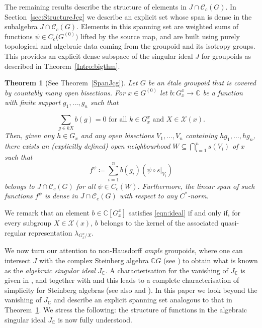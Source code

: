 \documentclass[11pt, oneside, reqno]{amsart}
\newcommand{\Gu}{G^{(0)}}
\newcommand{\cg}{\mathscr{C}_c(G)}
\newcommand{\PRLsep}{\noindent\makebox[\linewidth]{\resizebox{0.3333\linewidth}{1pt}{$\bullet$}}\bigskip}
\newtheorem{introthm}{Theorem}
\theoremstyle{definition}
\theoremstyle{remark}
\numberwithin{equation}{section}
\begin{document}
\PRLsep

\vspace{-0.1cm}
The remaining results  describe the structure of elements in $J \cap \cg$. In Section~\ref{sec:StructureJcg} we describe an explicit set whose span is dense in the subalgebra $J \cap \cg$. Elements in this spanning set are weighted sums of functions $\psi \in C_c\big(\Gu\big)$ lifted by the source map, and are built using purely topological and algebraic data coming from the groupoid and its isotropy groups. This provides an explicit dense subspace of the singular ideal $J$ for groupoids as described in Theorem~\ref{Intro:bigthm}. 

\begin{introthm}[See Theorem~\ref{SpanJcg}]\label{Intro:SpanJcg}
Let $G$ be an \'etale groupoid that is covered by countably many open bisections. For $x\in \Gu$ let $b \colon G^{x}_{x}\to\mathbb{C}$ be a function with finite support $g_1, \dots, g_n$ such that

\begin{equation}
\label{eqn:ideal}
\sum_{g\in kX} b(g) = 0 \text{ for all } k\in G^{x}_{x} \text{ and } X\in\mathcal{X}(x).
\end{equation}
Then, given any $h \in G_x$ and any open bisections $V_1, \dots, V_n$ containing $hg_1, \dots, hg_n$, there exists an (explicitly defined) open neighbourhood $W\subseteq \bigcap_{i=1}^n s(V_{i})$ of $x$ such that 
\begin{equation}
\label{eqn:construction}
f^{\psi} \coloneq \sum_{i=1}^n b(g_i)(\psi\circ s|_{V_{i}})
\end{equation}
belongs to $J \cap \cg$ for all $\psi\in C_{c}(W)$. Furthermore, the linear span of such functions $f^{\psi}$ is dense in $J\cap\cg$ with respect to any $C^*$-norm.
\end{introthm}

We remark that an element $b \in \mathbb{C}[G^x_x]$ satisfies \eqref{eqn:ideal} if and only if, for every subgroup $X \in \mathcal{X}(x)$, $b$ belongs to the kernel of the associated quasi-regular representation $\lambda_{G^x_x/X}$.

\PRLsep

We now turn our attention to non-Hausdorff \emph{ample} groupoids, where one can intersect $J$ with the complex Steinberg algebra $\mathbb{C}G$ (see \cite{S10}) to obtain what is known as the \emph{algebraic singular ideal} $J_\mathbb{C}$. A characterisation for the vanishing of $J_\mathbb{C}$ is given in \cite{BGHL}, and together with \cite{CEPSS} and \cite{SS21} this leads to a complete characterisation of simplicity for Steinberg algebras (see also \cite{SS23} and \cite{GNSV}). In this paper we look beyond the vanishing of $J_\mathbb{C}$ and describe an explicit spanning set analogous to that in Theorem~\ref{Intro:SpanJcg}. We stress the following: the structure of functions in the algebraic singular ideal $J_\mathbb{C}$ is now fully understood.
\end{document}
